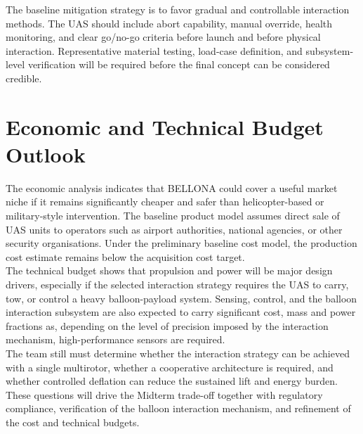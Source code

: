The baseline mitigation strategy is to favor gradual and controllable interaction methods. The UAS should include abort capability, manual override, health monitoring, and clear go/no-go criteria before launch and before physical interaction. Representative material testing, load-case definition, and subsystem-level verification will be required before the final concept can be considered credible.

\section*{Economic and Technical Budget Outlook}

The economic analysis indicates that BELLONA could cover a useful market niche if it remains significantly cheaper and safer than helicopter-based or military-style intervention. The baseline product model assumes direct sale of UAS units to operators such as airport authorities, national agencies, or other security organisations. Under the preliminary baseline cost model, the production cost estimate remains below the acquisition cost target.
\\

The technical budget shows that propulsion and power will be major design drivers, especially if the selected interaction strategy requires the UAS to carry, tow, or control a heavy balloon-payload system. Sensing, control, and the balloon interaction subsystem are also expected to carry significant cost, mass and power fractions as, depending on the level of precision imposed by the interaction mechanism, high-performance sensors are required.
\\

The team still must determine whether the interaction strategy can be achieved with a single multirotor, whether a cooperative architecture is required, and whether controlled deflation can reduce the sustained lift and energy burden. These questions will drive the Midterm trade-off together with regulatory compliance, verification of the balloon interaction mechanism, and refinement of the cost and technical budgets.


\newpage